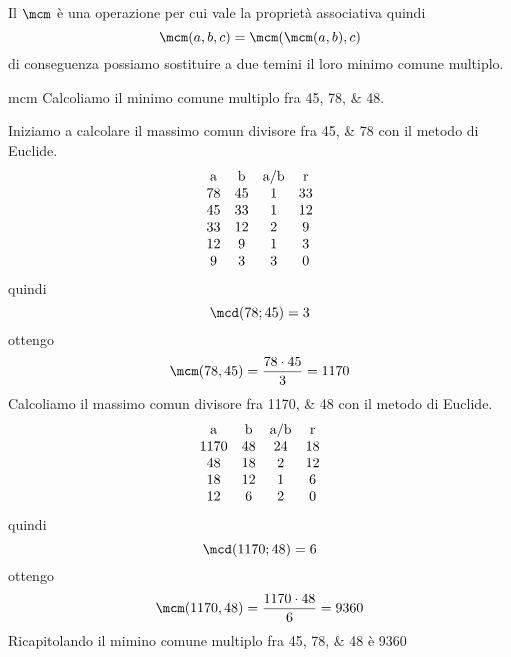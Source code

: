   Il $\mcm$ è una operazione per cui vale la proprietà associativa quindi\[\mcm(a,b,c)=\mcm(\mcm(a,b),c) \] di conseguenza possiamo sostituire a due temini il loro minimo comune multiplo.
  \begin{esempiot}{mcm}{}
  Calcoliamo il minimo comune multiplo fra \numlist{45;78;48}. 
    \end{esempiot}
  Iniziamo a calcolare il massimo comun divisore fra \numlist{45;78} con il metodo di Euclide.
     \[
       	   \begin{array}{cccc}
       	   $a$&$b$&$a/b$&$r$\\
       	   	78 & 45 & 1 & 33\\
       	   	45 & 33 & 1 & 12\\
       	   	33 & 12 & 2 & 9\\
			12 & 9 & 1 & 3\\
			9 & 3 & 3 & 0
       	    \end{array} 
       	     \]
       	quindi \[\mcd(78;45)=3\]
       		ottengo
       	  \[ \mcm(78,45)=\dfrac{78\cdot 45}{3}=1170\]
     Calcoliamo il massimo comun divisore fra \numlist{1170;48} con il metodo di Euclide.   	  
      \[
            	   \begin{array}{cccc}
            	   $a$&$b$&$a/b$&$r$\\
            	   	1170 & 48 & 24 & 18\\
            	   	48 & 18 & 2 & 12\\
            	   	18 & 12 & 1 & 6\\
     				12 & 6 & 2 & 0
            	    \end{array} 
            	     \]
            	quindi \[\mcd(1170;48)=6\]
            		ottengo
            	  \[ \mcm(1170,48)=\dfrac{1170\cdot 48}{6}=9360\]
      Ricapitolando il mimino comune multiplo fra \numlist{45;78;48} è \num{9360}
